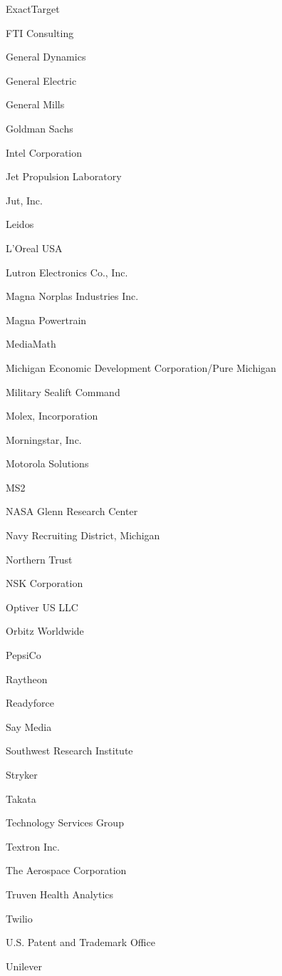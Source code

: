 \documentclass[twoside]{article}
\begin{document}
\begin{center}
\begin{multicols}{5}
\begin{FlushLeft}
\begin{compactitem}
\item ExactTarget
\item FTI Consulting
\item General Dynamics
\item General Electric
\item General Mills
\item Goldman Sachs
\item Intel Corporation
\item Jet Propulsion Laboratory
\item Jut, Inc.
\item Leidos
\item L'Oreal USA
\item Lutron Electronics Co., Inc.
\item Magna Norplas Industries Inc.
\item Magna Powertrain
\item MediaMath
\item Michigan Economic Development Corporation/Pure Michigan
\item Military Sealift Command
\item Molex, Incorporation
\item Morningstar, Inc.
\item Motorola Solutions
\item MS2
\item NASA Glenn Research Center
\item Navy Recruiting District, Michigan
\item Northern Trust
\item NSK Corporation
\item Optiver US LLC
\item Orbitz Worldwide
\item PepsiCo
\item Raytheon
\item Readyforce
\item Say Media
\item Southwest Research Institute
\item Stryker
\item Takata
\item Technology Services Group
\item Textron Inc.
\item The Aerospace Corporation
\item Truven Health Analytics
\item Twilio
\item U.S. Patent and Trademark Office
\item Unilever

\end{compactitem}
\end{FlushLeft}
\end{multicols}
\end{center}
\end{document}
